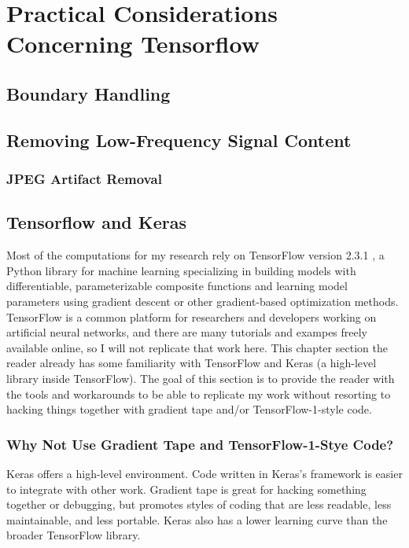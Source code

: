 \chapter{Practical Considerations Concerning Tensorflow}
\section{Boundary Handling}

\section{Removing Low-Frequency Signal Content}

\subsection{JPEG Artifact Removal}

\section{Tensorflow and Keras}
Most of the computations for my research rely on TensorFlow version 2.3.1 \cite{tensorflow}, a Python library for machine learning specializing in building models with differentiable, parameterizable composite functions and learning model parameters using gradient descent or other gradient-based optimization methods. TensorFlow is a common platform for researchers and developers working on artificial neural networks, and there are many tutorials and exampes freely available online, so I will not replicate that work here. This chapter section the reader already has some familiarity with TensorFlow and Keras \cite{keras} (a high-level library inside TensorFlow). The goal of this section is to provide the reader with the tools and workarounds to be able to replicate my work without resorting to hacking things together with gradient tape and/or TensorFlow-1-style code.

\subsection{Why Not Use Gradient Tape and TensorFlow-1-Stye Code?}
Keras offers a high-level environment. Code written in Keras's framework is easier to integrate with other work. Gradient tape is great for hacking something together or debugging, but promotes styles of coding that are less readable, less maintainable, and less portable. Keras also has a lower learning curve than the broader TensorFlow library.


